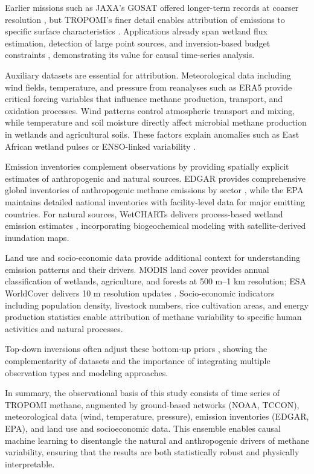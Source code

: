 Earlier missions such as JAXA's GOSAT offered longer-term records at coarser resolution \cite{Parker2018}, but TROPOMI's finer detail enables attribution of emissions to specific surface characteristics \cite{Pandey2021, Zhang2020}. Applications already span wetland flux estimation, detection of large point sources, and inversion-based budget constraints \cite{Pandey2021, Zhang2020, Maasakkers2019}, demonstrating its value for causal time-series analysis.

Auxiliary datasets are essential for attribution. Meteorological data including wind fields, temperature, and pressure from reanalyses such as ERA5 \cite{Hersbach2020} provide critical forcing variables that influence methane production, transport, and oxidation processes. Wind patterns control atmospheric transport and mixing, while temperature and soil moisture directly affect microbial methane production in wetlands and agricultural soils. These factors explain anomalies such as East African wetland pulses \cite{Lunt2021} or ENSO-linked variability \cite{Parker2018}. 

Emission inventories complement observations by providing spatially explicit estimates of anthropogenic and natural sources. EDGAR provides comprehensive global inventories of anthropogenic methane emissions by sector \cite{Crippa2020}, while the EPA maintains detailed national inventories with facility-level data for major emitting countries. For natural sources, WetCHARTs delivers process-based wetland emission estimates \cite{Bloom2017}, incorporating biogeochemical modeling with satellite-derived inundation maps.

Land use and socio-economic data provide additional context for understanding emission patterns and their drivers. MODIS land cover \cite{Friedl2010} provides annual classification of wetlands, agriculture, and forests at 500 m--1 km resolution; ESA WorldCover delivers 10 m resolution updates \cite{Lorente2021}. Socio-economic indicators including population density, livestock numbers, rice cultivation areas, and energy production statistics enable attribution of methane variability to specific human activities and natural processes.

Top-down inversions often adjust these bottom-up priors \cite{Maasakkers2019, Saunois2020}, showing the complementarity of datasets and the importance of integrating multiple observation types and modeling approaches.

In summary, the observational basis of this study consists of time series of TROPOMI methane, augmented by ground-based networks (NOAA, TCCON), meteorological data (wind, temperature, pressure), emission inventories (EDGAR, EPA), and land use and socioeconomic data. This ensemble enables causal machine learning to disentangle the natural and anthropogenic drivers of methane variability, ensuring that the results are both statistically robust and physically interpretable.

